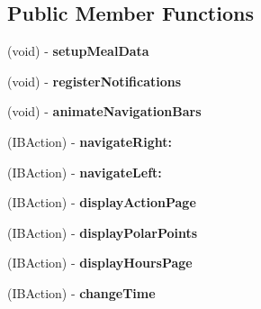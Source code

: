 \subsection*{Public Member Functions}
\begin{DoxyCompactItemize}
\item 
\hypertarget{interface_root_view_controller_a44a6fe605ce59a694cb1004b1dcbf01c}{
(void) -\/ {\bfseries setupMealData}}
\label{interface_root_view_controller_a44a6fe605ce59a694cb1004b1dcbf01c}

\item 
\hypertarget{interface_root_view_controller_a2463e95071ba2b0fdad2870ec335c74a}{
(void) -\/ {\bfseries registerNotifications}}
\label{interface_root_view_controller_a2463e95071ba2b0fdad2870ec335c74a}

\item 
\hypertarget{interface_root_view_controller_abdc75a8f3a35ad9faa32c71b1dcd3094}{
(void) -\/ {\bfseries animateNavigationBars}}
\label{interface_root_view_controller_abdc75a8f3a35ad9faa32c71b1dcd3094}

\item 
\hypertarget{interface_root_view_controller_a6aaf3df4346735dd0ea91d98f734cae8}{
(IBAction) -\/ {\bfseries navigateRight:}}
\label{interface_root_view_controller_a6aaf3df4346735dd0ea91d98f734cae8}

\item 
\hypertarget{interface_root_view_controller_ac6d6e6d9095525f1ec29961c4fc873dd}{
(IBAction) -\/ {\bfseries navigateLeft:}}
\label{interface_root_view_controller_ac6d6e6d9095525f1ec29961c4fc873dd}

\item 
\hypertarget{interface_root_view_controller_a66cd03ae62da310222bbdf9f2f19fdfd}{
(IBAction) -\/ {\bfseries displayActionPage}}
\label{interface_root_view_controller_a66cd03ae62da310222bbdf9f2f19fdfd}

\item 
\hypertarget{interface_root_view_controller_a20c776f2fc7df109df84ae2dbb4b9032}{
(IBAction) -\/ {\bfseries displayPolarPoints}}
\label{interface_root_view_controller_a20c776f2fc7df109df84ae2dbb4b9032}

\item 
\hypertarget{interface_root_view_controller_a4e8289c67e00d4675738422629195e9a}{
(IBAction) -\/ {\bfseries displayHoursPage}}
\label{interface_root_view_controller_a4e8289c67e00d4675738422629195e9a}

\item 
\hypertarget{interface_root_view_controller_a1c614bcdfd08821c4d0412d1993ae155}{
(IBAction) -\/ {\bfseries changeTime}}
\label{interface_root_view_controller_a1c614bcdfd08821c4d0412d1993ae155}

\end{DoxyCompactItemize}
